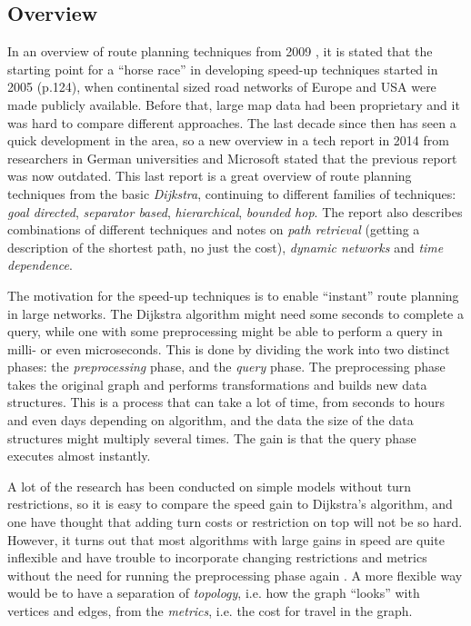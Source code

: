 \documentclass[../main.tex]{subfiles}
\begin{document}
\subsection{Overview}
In an overview of route planning techniques from 2009 \cite{overview-2009}, it is stated that the starting point for a ``horse race'' in developing speed-up techniques started in 2005 (p.124), when continental sized road networks of Europe and USA were made publicly available. Before that, large map data had been proprietary and it was hard to compare different approaches. The last decade since then has seen a quick development in the area, so a new overview in a tech report in 2014 from researchers in German universities and Microsoft \cite{msr-route-planning-2014} stated that the previous report was now outdated. This last report is a great overview of route planning techniques from the basic \emph{Dijkstra}, continuing to different families of techniques: \emph{goal directed}, \emph{separator based}, \emph{hierarchical}, \emph{bounded hop}. The report also describes combinations of different techniques and notes on \emph{path retrieval} (getting a description of the shortest path, no just the cost), \emph{dynamic networks} and \emph{time dependence}.

The motivation for the speed-up techniques is to enable ``instant'' route planning in large networks. The Dijkstra algorithm might need some seconds to complete a query, while one with some preprocessing might be able to perform a query in milli- or even microseconds. This is done by dividing the work into two distinct phases: the \emph{preprocessing} phase, and the \emph{query} phase. The preprocessing phase takes the original graph and performs transformations and builds new data structures. This is a process that can take a lot of time, from seconds to hours and even days depending on algorithm, and the data the size of the data structures might multiply several times. The gain is that the query phase executes almost instantly.

A lot of the research has been conducted on simple models without turn restrictions, so it is easy to compare the speed gain to Dijkstra's algorithm, and one have thought that adding turn costs or restriction on top will not be so hard. However, it turns out that most algorithms with large gains in speed are quite inflexible and have trouble to incorporate changing restrictions and metrics without the need for running the preprocessing phase again \cite[p.2]{crp-2013}. A more flexible way would be to have a separation of \emph{topology}, i.e. how the graph ``looks'' with vertices and edges, from the \emph{metrics}, i.e. the cost for travel in the graph.
\end{document}

